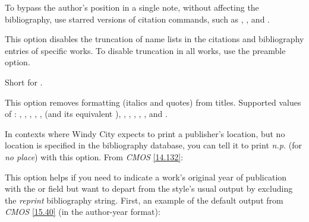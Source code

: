 \documentclass[11pt,letterpaper,oneside]{article}
\begin{document}
\begin{optionlist}
\begin{citebib}
\item \cite{chaucer1966}
\end{citebib}

\noindent To bypass the author's position in a single note, without
affecting the bibliography, use starred versions of citation commands,
such as , , and .


\noindent This option disables the truncation of name lists in the
citations and bibliography entries of specific works. To disable
truncation in all works, use the  preamble option.


\noindent Short for .


\noindent This option removes formatting (italics and quotes) from
titles. Supported values of : ,
, , ,
,  (and its equivalent
), , ,
, ,
, and .


\noindent In contexts where Windy City expects to print a publisher's
location, but no location is specified in the bibliography database,
you can tell it to print \textit{n.p.} (for \textit{no place}) with
this option. From \textit{CMOS} \ref{14.132}:

\begin{citenobib}
\item[] \cite{windsor1910}
\end{citenobib}


\noindent This option helps if you need to indicate a work's original
year of publication with the  or
 field but want to depart from the style's usual
output by excluding the \textit{reprint} bibliography string. First,
an example of the default output from \textit{CMOS} \ref{15.40} (in
the author-year format):


\end{optionlist}
\end{document}
